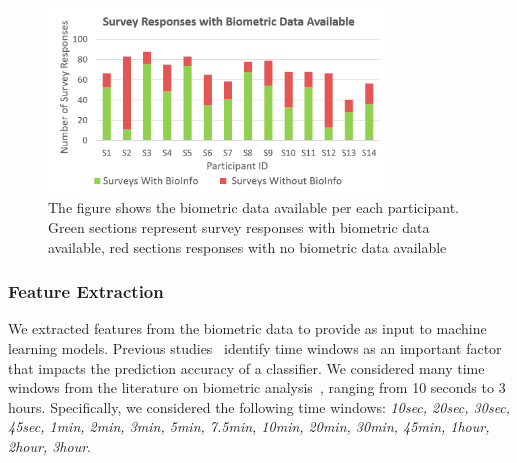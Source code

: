 \begin{figure}
  \centering
      \includegraphics[width=0.8\textwidth]{DuringTheDay.png}
  \caption{The figure shows the biometric data available per each participant. Green sections represent survey responses with biometric
  data available, red sections responses with no biometric data available}
   \label{surveyBio}
   \vspace*{-4mm}
\end{figure}


\subsubsection{Feature Extraction}
We extracted features from the biometric data to provide as input to machine 
learning models. Previous 
studies~ \cite{vorburger05,zuger2015interruptibility} identify time windows as an 
important factor that impacts the prediction accuracy of a classifier. We 
considered many time windows from the literature on biometric 
analysis~\cite{zuger18}, ranging from 10 seconds to 3 hours. Specifically, we 
considered the following time windows: \textit{10sec, 20sec, 30sec, 45sec, 
1min, 2min, 3min, 5min, 7.5min, 10min, 20min, 30min, 45min, 1hour, 2hour, 
3hour}.

